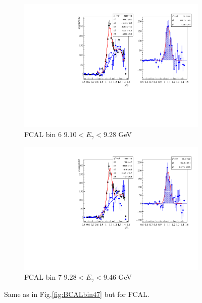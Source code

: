 \documentclass[%
preprint,
nofootinbib,
 amsmath,amssymb,
 aps,
floatfix,
]{revtex4-1}
\begin{document}
\begin{figure}[h]
\begin{subfigure}[b]{0.49\textwidth}
    \includegraphics[width=\textwidth]{./fig/AN2_PovE_FCAL_bin6.pdf}
    \caption{FCAL bin 6 $9.10<E_\gamma <9.28$ GeV}
    \label{fig:FCALbin6}
  \end{subfigure}
  \begin{subfigure}[b]{0.49\textwidth}
    \includegraphics[width=\textwidth]{./fig/AN2_PovE_FCAL_bin7.pdf}
    \caption{FCAL bin 7 $9.28<E_\gamma <9.46$ GeV}
    \label{fig:FCALbin7}
  \end{subfigure}
  \caption{
Same as in Fig.\ref{fig:BCALbin47} but for FCAL.
}\label{fig:FCALbin47}
\end{figure}


\end{document}

